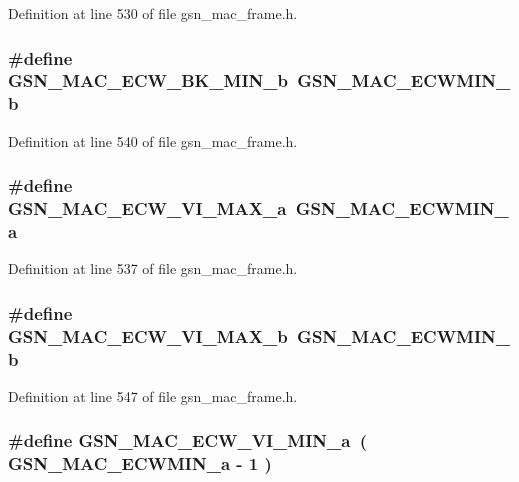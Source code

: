 Definition at line 530 of file gsn\_\-mac\_\-frame.h.

\hypertarget{a00523_a421de5cf804d0a973f5393fabc543bd6}{
\subsubsection[{GSN\_\-MAC\_\-ECW\_\-BK\_\-MIN\_\-b}]{\setlength{\rightskip}{0pt plus 5cm}\#define GSN\_\-MAC\_\-ECW\_\-BK\_\-MIN\_\-b~GSN\_\-MAC\_\-ECWMIN\_\-b}}
\label{a00523_a421de5cf804d0a973f5393fabc543bd6}


Definition at line 540 of file gsn\_\-mac\_\-frame.h.

\hypertarget{a00523_a7920319f793fb32861405f08d5b39b70}{
\subsubsection[{GSN\_\-MAC\_\-ECW\_\-VI\_\-MAX\_\-a}]{\setlength{\rightskip}{0pt plus 5cm}\#define GSN\_\-MAC\_\-ECW\_\-VI\_\-MAX\_\-a~GSN\_\-MAC\_\-ECWMIN\_\-a}}
\label{a00523_a7920319f793fb32861405f08d5b39b70}


Definition at line 537 of file gsn\_\-mac\_\-frame.h.

\hypertarget{a00523_abaa42d440b9141aaf319c55689640ad7}{
\subsubsection[{GSN\_\-MAC\_\-ECW\_\-VI\_\-MAX\_\-b}]{\setlength{\rightskip}{0pt plus 5cm}\#define GSN\_\-MAC\_\-ECW\_\-VI\_\-MAX\_\-b~GSN\_\-MAC\_\-ECWMIN\_\-b}}
\label{a00523_abaa42d440b9141aaf319c55689640ad7}


Definition at line 547 of file gsn\_\-mac\_\-frame.h.

\hypertarget{a00523_a98024fbca5c5a27cfbb9838b6359ecf2}{
\subsubsection[{GSN\_\-MAC\_\-ECW\_\-VI\_\-MIN\_\-a}]{\setlength{\rightskip}{0pt plus 5cm}\#define GSN\_\-MAC\_\-ECW\_\-VI\_\-MIN\_\-a~( GSN\_\-MAC\_\-ECWMIN\_\-a -\/ 1 )}}
\label{a00523_a98024fbca5c5a27cfbb9838b6359ecf2}


